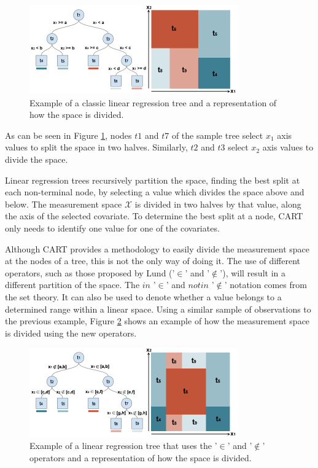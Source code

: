 \documentclass[times,twocolumn,final,authoryear]{elsarticle}
\begin{document}
\begin{figure}
  \includegraphics[width=9cm]{fig1_master2.png}
\caption{Example of a classic linear regression tree and a representation of how the space is divided. }
\label{f1}       %
\end{figure}
%
 
As can be seen in Figure \ref{f1}, nodes $t1$ and $t7$ of the sample tree select $x_1$ axis values to split the space in two halves. Similarly, $t2$ and $t3$ select $x_2$ axis values to divide the space.

Linear regression trees recursively partition the space, finding the best split at each non-terminal node, by selecting a value which divides the space above and below. The measurement space $\mathcal{X}$ is divided in two halves by that value, along the axis of the selected covariate. To determine the best split at a node, CART only needs to identify one value for one of the covariates.

Although CART provides a methodology to easily divide the measurement space at the nodes of a tree, this is not the only way of doing it. The use of different operators, such as those proposed by Lund ('$\in$' and '$\notin$'), will result in a different partition of the space. The $in$ '$\in$' and $not in$ '$\notin$' notation comes from the set theory. It can also be used to denote whether a value belongs to a determined range within a linear space. Using a similar sample of observations to the previous example, Figure \ref{f2} shows an example of how the measurement space is divided using the new operators.

%
\begin{figure}
  \includegraphics[width=9cm]{fig2_master2.png}
\caption{Example of a linear regression tree that uses the '$\in$' and '$\notin$' operators and a representation of how the space is divided.}
\label{f2}       %
\end{figure}
%
\end{document}
